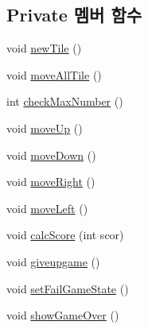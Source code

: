\subsection*{Private 멤버 함수}
\begin{DoxyCompactItemize}
\item 
void \hyperlink{class_code_lady_j_j_y_1_1game2048_1_1_game_scene_ac036ab4708fc6a171ced9b66e48ffa84}{new\+Tile} ()
\item 
void \hyperlink{class_code_lady_j_j_y_1_1game2048_1_1_game_scene_a02da4d987524f8b139bc11a60d94fe6e}{move\+All\+Tile} ()
\item 
int \hyperlink{class_code_lady_j_j_y_1_1game2048_1_1_game_scene_af5621ff5eb0f168f9c8812c72018a82d}{check\+Max\+Number} ()
\item 
void \hyperlink{class_code_lady_j_j_y_1_1game2048_1_1_game_scene_a349029ddf5f814098e6baaec7d9d0a80}{move\+Up} ()
\item 
void \hyperlink{class_code_lady_j_j_y_1_1game2048_1_1_game_scene_aeab011d4ae7c31cf2f83ae8ab883ccee}{move\+Down} ()
\item 
void \hyperlink{class_code_lady_j_j_y_1_1game2048_1_1_game_scene_af8bb00dc442393f68910ca3eb80e92eb}{move\+Right} ()
\item 
void \hyperlink{class_code_lady_j_j_y_1_1game2048_1_1_game_scene_abb3016da3b2e356d2e05725fb5ce3b96}{move\+Left} ()
\item 
void \hyperlink{class_code_lady_j_j_y_1_1game2048_1_1_game_scene_ad08ac2bf0b55768bfbb825dea8d6e6b3}{calc\+Score} (int scor)
\item 
void \hyperlink{class_code_lady_j_j_y_1_1game2048_1_1_game_scene_a555636f47220602c6b2b25f6594b9dd0}{giveupgame} ()
\item 
void \hyperlink{class_code_lady_j_j_y_1_1game2048_1_1_game_scene_a85a543aab574d4d4c883da63e57ab47f}{set\+Fail\+Game\+State} ()
\item 
void \hyperlink{class_code_lady_j_j_y_1_1game2048_1_1_game_scene_aa4bf235881780a4db15f68759db4f922}{show\+Game\+Over} ()
\end{DoxyCompactItemize}
